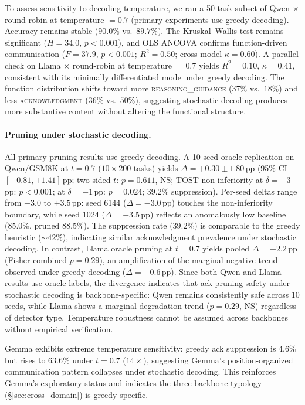 To assess sensitivity to decoding temperature, we ran a 50-task subset of Qwen $\times$ round-robin at temperature $= 0.7$ (primary experiments use greedy decoding). Accuracy remains stable ($90.0\%$ vs.\ $89.7\%$). The Kruskal--Wallis test remains significant ($H = 34.0$, $p < 0.001$), and OLS ANCOVA confirms function-driven communication ($F = 37.9$, $p < 0.001$; $R^2 = 0.50$; cross-model $\kappa = 0.60$). A parallel check on Llama $\times$ round-robin at temperature $= 0.7$ yields $R^2 = 0.10$, $\kappa = 0.41$, consistent with its minimally differentiated mode under greedy decoding. The function distribution shifts toward more \textsc{reasoning\_guidance} ($37\%$ vs.\ $18\%$) and less \textsc{acknowledgment} ($36\%$ vs.\ $50\%$), suggesting stochastic decoding produces more substantive content without altering the functional structure.

\paragraph{Pruning under stochastic decoding.}
All primary pruning results use greedy decoding. A 10-seed oracle replication on Qwen/GSM8K at $t{=}0.7$ ($10 \times 200$ tasks) yields $\Delta = +0.30 \pm 1.80$\,pp (95\% CI $[-0.81, +1.41]$\,pp; two-sided $t$: $p = 0.611$, NS; TOST non-inferiority at $\delta = -3$\,pp: $p < 0.001$; at $\delta = -1$\,pp: $p = 0.024$; 39.2\% suppression). Per-seed deltas range from $-3.0$ to $+3.5$\,pp: seed 6144 ($\Delta = -3.0$\,pp) touches the non-inferiority boundary, while seed 1024 ($\Delta = +3.5$\,pp) reflects an anomalously low baseline (85.0\%, pruned 88.5\%). The suppression rate (39.2\%) is comparable to the greedy heuristic (${\sim}42\%$), indicating similar acknowledgment prevalence under stochastic decoding. In contrast, Llama oracle pruning at $t{=}0.7$ yields pooled $\Delta = -2.2$\,pp (Fisher combined $p = 0.29$), an amplification of the marginal negative trend observed under greedy decoding ($\Delta = -0.6$\,pp). Since both Qwen and Llama results use oracle labels, the divergence indicates that ack pruning safety under stochastic decoding is backbone-specific: Qwen remains consistently safe across 10 seeds, while Llama shows a marginal degradation trend ($p = 0.29$, NS) regardless of detector type. Temperature robustness cannot be assumed across backbones without empirical verification.

Gemma exhibits extreme temperature sensitivity: greedy ack suppression is 4.6\% but rises to 63.6\% under $t{=}0.7$ ($14\times$), suggesting Gemma's position-organized communication pattern collapses under stochastic decoding. This reinforces Gemma's exploratory status and indicates the three-backbone typology (\S\ref{sec:cross_domain}) is greedy-specific.

